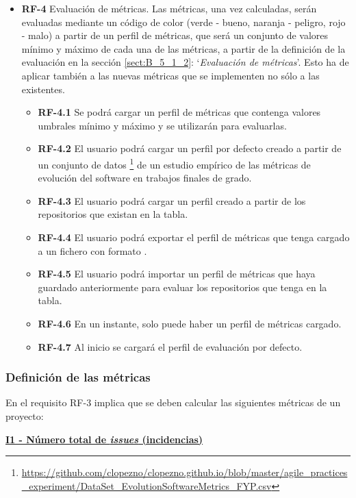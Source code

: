 \begin{itemize}
\begin{itemize}
	\end{itemize}
	\item \textbf{RF-4} Evaluación de métricas. Las métricas, una vez calculadas, serán evaluadas mediante un código de color (verde - bueno, naranja - peligro, rojo - malo) a partir de un perfil de métricas, que será un conjunto de valores mínimo y máximo de cada una de las métricas, a partir de la definición de la evaluación en la sección \ref{sect:B_5_1_2}: `\textit{Evaluación de métricas}'. Esto ha de aplicar también a las nuevas métricas que se implementen no sólo a las existentes.
	\begin{itemize}
		\item \textbf{RF-4.1} Se podrá cargar un perfil de métricas que contenga valores umbrales mínimo y máximo y se utilizarán para evaluarlas.
		\item \textbf{RF-4.2} El usuario podrá cargar un perfil por defecto creado a partir de un conjunto de datos \footnote{\url{https://github.com/clopezno/clopezno.github.io/blob/master/agile_practices_experiment/DataSet_EvolutionSoftwareMetrics_FYP.csv}} de un estudio empírico de las métricas de evolución del software en trabajos finales de grado\cite{lopez_nozal_measuring_2019}.
		\item \textbf{RF-4.3} El usuario podrá cargar un perfil creado a partir de los repositorios que existan en la tabla.
		\item \textbf{RF-4.4} El usuario podrá exportar el perfil de métricas que tenga cargado a un fichero con formato .
		\item \textbf{RF-4.5} El usuario podrá importar un perfil de métricas que haya guardado anteriormente para evaluar los repositorios que tenga en la tabla.
		\item \textbf{RF-4.6} En un instante, solo puede haber un perfil de métricas cargado.
		\item \textbf{RF-4.7} Al inicio se cargará el perfil de evaluación por defecto.
	\end{itemize}
\end{itemize}

\subsubsection{Definición de las métricas}\label{sect:B_5_1_1}

En el requisito RF-3 implica que se deben calcular las siguientes métricas de un proyecto:

\textbf{\underline{I1 - Número total de \textit{issues} (incidencias)}}

